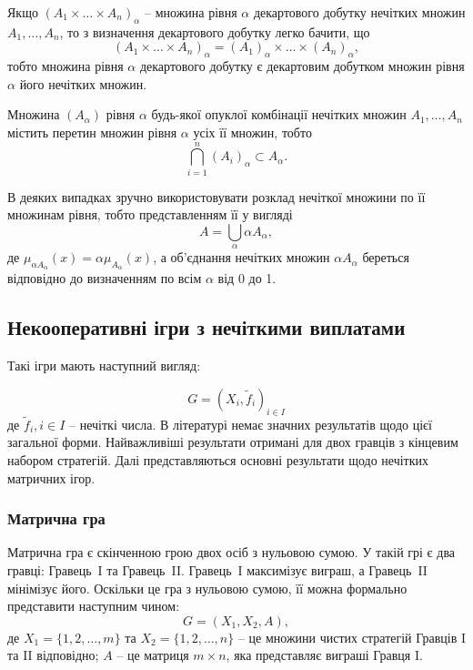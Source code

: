 \documentclass[14pt, a4paper, oneside]{extarticle}
\numberwithin{equation}{section}
\begin{document}
Якщо $\left(A_1 \times \ldots \times A_n\right)_\alpha$ -- множина рівня $\alpha$ декартового добутку нечітких множин $A_1, \ldots, A_n$, то з визначення декартового добутку легко бачити, що
\begin{equation}
\left(A_1 \times \ldots \times A_n\right)_\alpha=\left(A_1\right)_\alpha \times \ldots \times\left(A_n\right)_\alpha,
\end{equation}
тобто множина рівня $\alpha$ декартового добутку є декартовим добутком множин рівня $\alpha$ його нечітких множин.

Множина $\left(A_\alpha\right)$ рівня $\alpha$ будь-якої опуклої комбінації нечітких множин $A_1, \ldots, A_n$ містить перетин множин рівня $\alpha$ усіх її множин, тобто
\begin{equation}
\bigcap_{i=1}^n\left(A_i\right)_\alpha \subset A_{\alpha}.
\end{equation}

В деяких випадках зручно використовувати розклад нечіткої множини по її множинам рівня, тобто представленням її у вигляді
\begin{equation}
A=\bigcup_\alpha \alpha A_\alpha,
\end{equation}
де $\mu_{\alpha A_\alpha}(x)=\alpha \mu_{A_\alpha}(x)$, а об'єднання нечітких множин $\alpha A_\alpha$ береться відповідно до визначенням по всім $\alpha$ від 0 до 1.

\subsection{Некооперативні ігри з нечіткими виплатами}
Такі ігри мають наступний вигляд:

\begin{equation}
G=\left(X_{i}, \tilde{f}_{i} \right)_{i \in I}
\end{equation}
де $\tilde{f}_{i}, i \in I$ -- нечіткі числа. В літературі немає значних результатів щодо цієї загальної форми. Найважливіші результати отримані для двох гравців з кінцевим набором стратегій. Далі представляються основні результати щодо нечітких матричних ігор. \cite{Larbani}

\subsubsection{Матрична гра}
Матрична гра є скінченною грою двох осіб з нульовою сумою. У такій грі є два гравці: Гравець~I та Гравець~II. Гравець~I максимізує виграш, а Гравець~II мінімізує його. Оскільки це гра з нульовою сумою, її можна формально представити наступним чином:
\begin{equation}
G=\left(X_{1}, X_{2}, A\right),
\end{equation}
де $X_{1}=\{1,2, \ldots, m\}$ та $X_{2}=\{1,2, \ldots, n\}$ -- це множини чистих стратегій Гравців I та II відповідно; $A$ -- це матриця $m \times n$, яка представляє виграші Гравця I.
\end{document}
